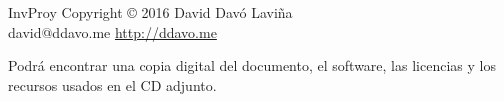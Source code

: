 \documentclass[a4paper, 11pt]{report} %
\begin{document}
\centering
InvProy \hspace*{10pt} Copyright \copyright\hspace*{10pt} 2016 \hspace*{15pt} David Davó Laviña \\ \hspace*{15pt} david@ddavo.me \hspace*{10pt} \url{http://ddavo.me}

\vspace{0.7cm}
\noindent\centering
\begin{minipage}{13cm}
\centering Podrá encontrar una copia digital del documento, el software, las licencias y los recursos usados en el CD adjunto.
\end{minipage}

\vspace*{1cm}
\centering\framebox[12.5cm]{
\raisebox{0pt}[12.5cm][0pt]{
}} %

\end{document}
